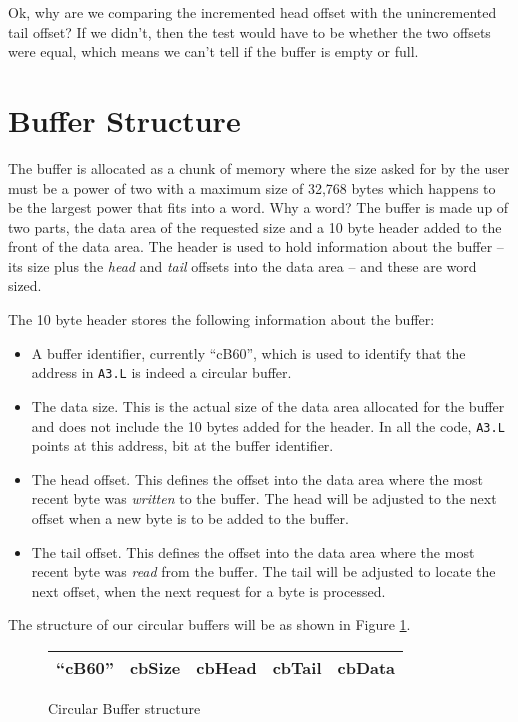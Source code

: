 Ok, why are we comparing the incremented head offset with the unincremented
tail offset? If we didn't, then the test would have to be whether
the two offsets were equal, which means we can't tell if the buffer
is empty or full.

\section{Buffer Structure}

The buffer is allocated as a chunk of memory where the size asked
for by the user must be a power of two with a maximum size of 32,768
bytes which happens to be the largest power that fits into a word.
Why a word? The buffer is made up of two parts, the data area of the
requested size and a 10 byte header added to the front of the data
area. The header is used to hold information about the buffer --
its size plus the \emph{head} and \emph{tail} offsets into the data
area -- and these are word sized.

The 10 byte header stores the following information about the buffer:
\begin{itemize}
\item A buffer identifier, currently ``cB60'', which is used to identify
that the address in \texttt{A3.L} is indeed a circular buffer.
\item The data size. This is the actual size of the data area allocated
for the buffer and does not include the 10 bytes added for the header.
In all the code, \texttt{A3.L} points at this address, bit at the
buffer identifier.
\item The head offset. This defines the offset into the data area where
the most recent byte was \emph{written} to the buffer. The head will
be adjusted to the next offset when a new byte is to be added to the
buffer.
\item The tail offset. This defines the offset into the data area where
the most recent byte was \emph{read} from the buffer. The tail will
be adjusted to locate the next offset, when the next request for a
byte is processed.
\end{itemize}
The structure of our circular buffers will be as shown in Figure \ref{fig:Circular-Buffer-structure}.

\begin{figure}[!h]
\begin{tabular}{|c|c|c|c||p{}|}
\hline 
``cB60'' & cbSize & cbHead & cbTail & cbData\tabularnewline
\hline 
\end{tabular}
\begin{centering}
\caption{Circular Buffer structure\label{fig:Circular-Buffer-structure}}
\par\end{centering}
\end{figure}

